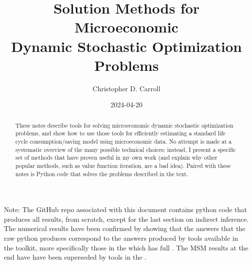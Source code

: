 \documentclass[titlepage, headings=optiontotocandhead]{Resources/texmf-local/tex/latex/econtex}
\begin{document}


\title{Solution Methods for Microeconomic \\ Dynamic Stochastic Optimization Problems}

\author{Christopher D. Carroll\authNum}


\date{2024-04-20}
\maketitle
\footnotesize

\noindent  Note: The GitHub repo {\SMDSOPrepo} associated with this document contains python code that produces all results, from scratch, except for the last section on indirect inference.  The numerical results have been confirmed by showing that the answers that the raw python produces correspond to the answers produced by tools available in the {\ARKurl} toolkit, more specifically those in the {\HARKrepo} which has full {\HARKdocs}.  The MSM results at the end have have been superseded by tools in the {\EMDSOPrepo}.

\normalsize

\hypertarget{abstract}{}
\begin{abstract}
  These notes describe tools for solving microeconomic dynamic stochastic optimization problems, and show how to use those tools for efficiently estimating a standard life cycle consumption/saving model using microeconomic data.  No attempt is made at a systematic overview of the many possible technical choices; instead, I present a specific set of methods that have proven useful in my own work (and explain why other popular methods, such as value function iteration, are a bad idea).  Paired with these notes is Python code that solves the problems described in the text.
\end{abstract}
\end{document}
